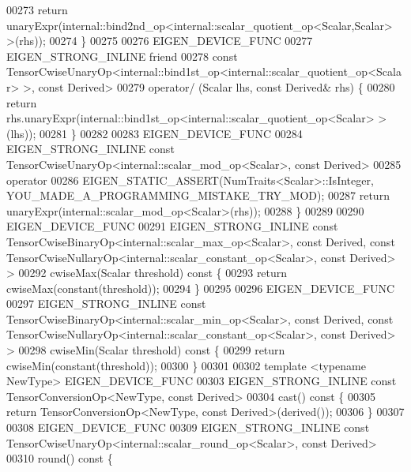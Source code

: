 \begin{DoxyCode}
00273       \textcolor{keywordflow}{return} unaryExpr(internal::bind2nd\_op<internal::scalar\_quotient\_op<Scalar,Scalar> >(rhs));
00274     \}
00275 
00276     EIGEN\_DEVICE\_FUNC
00277     EIGEN\_STRONG\_INLINE \textcolor{keyword}{friend}
00278     \textcolor{keyword}{const} TensorCwiseUnaryOp<internal::bind1st\_op<internal::scalar\_quotient\_op<Scalar> >, \textcolor{keyword}{const} Derived>
00279     operator/ (Scalar lhs, \textcolor{keyword}{const} Derived& rhs) \{
00280       \textcolor{keywordflow}{return} rhs.unaryExpr(internal::bind1st\_op<internal::scalar\_quotient\_op<Scalar> >(lhs));
00281     \}
00282 
00283     EIGEN\_DEVICE\_FUNC
00284     EIGEN\_STRONG\_INLINE \textcolor{keyword}{const} TensorCwiseUnaryOp<internal::scalar\_mod\_op<Scalar>, \textcolor{keyword}{const} Derived>
00285     operator%
00286       EIGEN\_STATIC\_ASSERT(NumTraits<Scalar>::IsInteger, YOU\_MADE\_A\_PROGRAMMING\_MISTAKE\_TRY\_MOD);
00287       \textcolor{keywordflow}{return} unaryExpr(internal::scalar\_mod\_op<Scalar>(rhs));
00288     \}
00289 
00290     EIGEN\_DEVICE\_FUNC
00291     EIGEN\_STRONG\_INLINE \textcolor{keyword}{const} TensorCwiseBinaryOp<internal::scalar\_max\_op<Scalar>, \textcolor{keyword}{const} Derived, \textcolor{keyword}{const} 
      TensorCwiseNullaryOp<internal::scalar\_constant\_op<Scalar>, \textcolor{keyword}{const} Derived> >
00292     cwiseMax(Scalar threshold)\textcolor{keyword}{ const }\{
00293       \textcolor{keywordflow}{return} cwiseMax(constant(threshold));
00294     \}
00295 
00296     EIGEN\_DEVICE\_FUNC
00297     EIGEN\_STRONG\_INLINE \textcolor{keyword}{const} TensorCwiseBinaryOp<internal::scalar\_min\_op<Scalar>, \textcolor{keyword}{const} Derived, \textcolor{keyword}{const} 
      TensorCwiseNullaryOp<internal::scalar\_constant\_op<Scalar>, \textcolor{keyword}{const} Derived> >
00298     cwiseMin(Scalar threshold)\textcolor{keyword}{ const }\{
00299       \textcolor{keywordflow}{return} cwiseMin(constant(threshold));
00300     \}
00301 
00302     \textcolor{keyword}{template} <\textcolor{keyword}{typename} NewType> EIGEN\_DEVICE\_FUNC
00303     EIGEN\_STRONG\_INLINE \textcolor{keyword}{const} TensorConversionOp<NewType, const Derived>
00304     cast()\textcolor{keyword}{ const }\{
00305       \textcolor{keywordflow}{return} TensorConversionOp<NewType, const Derived>(derived());
00306     \}
00307 
00308     EIGEN\_DEVICE\_FUNC
00309     EIGEN\_STRONG\_INLINE \textcolor{keyword}{const} TensorCwiseUnaryOp<internal::scalar\_round\_op<Scalar>, \textcolor{keyword}{const} Derived>
00310     round()\textcolor{keyword}{ const }\{

\end{DoxyCode}

